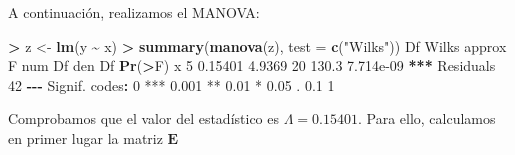 \documentclass[
  a4paper,
  oneside]{scrbook}
\newenvironment{Shaded}{\begin{snugshade}}{\end{snugshade}}
\newcommand{\AttributeTok}[1]{\textcolor[rgb]{0.13,0.29,0.53}{#1}}
\newcommand{\CommentTok}[1]{\textcolor[rgb]{0.56,0.35,0.01}{\textit{#1}}}
\newcommand{\DecValTok}[1]{\textcolor[rgb]{0.00,0.00,0.81}{#1}}
\newcommand{\ErrorTok}[1]{\textcolor[rgb]{0.64,0.00,0.00}{\textbf{#1}}}
\newcommand{\FloatTok}[1]{\textcolor[rgb]{0.00,0.00,0.81}{#1}}
\newcommand{\FunctionTok}[1]{\textcolor[rgb]{0.13,0.29,0.53}{\textbf{#1}}}
\newcommand{\NormalTok}[1]{#1}
\newcommand{\OtherTok}[1]{\textcolor[rgb]{0.56,0.35,0.01}{#1}}
\newcommand{\SpecialCharTok}[1]{\textcolor[rgb]{0.81,0.36,0.00}{\textbf{#1}}}
\newcommand{\StringTok}[1]{\textcolor[rgb]{0.31,0.60,0.02}{#1}}
\theoremstyle{definition}
\theoremstyle{definition}
\theoremstyle{definition}
\theoremstyle{definition}
\theoremstyle{remark}
\begin{document}
\normalsize

A continuación, realizamos el MANOVA:

\footnotesize

\begin{Shaded}
\begin{Highlighting}[]
\SpecialCharTok{\textgreater{}}\NormalTok{ z }\OtherTok{\textless{}{-}} \FunctionTok{lm}\NormalTok{(y }\SpecialCharTok{\textasciitilde{}}\NormalTok{ x)}
\SpecialCharTok{\textgreater{}} \FunctionTok{summary}\NormalTok{(}\FunctionTok{manova}\NormalTok{(z), }\AttributeTok{test =} \FunctionTok{c}\NormalTok{(}\StringTok{"Wilks"}\NormalTok{))}
\NormalTok{          Df   Wilks approx F num Df den Df    }\FunctionTok{Pr}\NormalTok{(}\SpecialCharTok{\textgreater{}}\NormalTok{F)    }
\NormalTok{x          }\DecValTok{5} \FloatTok{0.15401}   \FloatTok{4.9369}     \DecValTok{20}  \FloatTok{130.3} \FloatTok{7.714e{-}09} \SpecialCharTok{**}\ErrorTok{*}
\NormalTok{Residuals }\DecValTok{42}                                             
\SpecialCharTok{{-}{-}{-}}
\NormalTok{Signif. codes}\SpecialCharTok{:}  \DecValTok{0} \StringTok{\textquotesingle{}***\textquotesingle{}} \FloatTok{0.001} \StringTok{\textquotesingle{}**\textquotesingle{}} \FloatTok{0.01} \StringTok{\textquotesingle{}*\textquotesingle{}} \FloatTok{0.05} \StringTok{\textquotesingle{}.\textquotesingle{}} \FloatTok{0.1} \StringTok{\textquotesingle{} \textquotesingle{}} \DecValTok{1}
\end{Highlighting}
\end{Shaded}

\normalsize

Comprobamos que el valor del estadístico es \(\Lambda=0.15401\). Para
ello, calculamos en primer lugar la matriz \(\bm{E}\)

\footnotesize

\begin{Shaded}
\end{Shaded}
\end{document}
